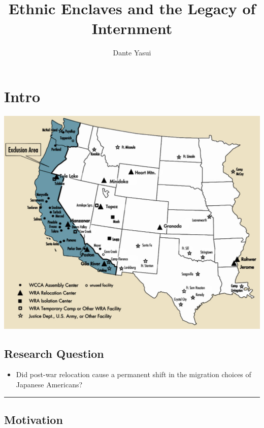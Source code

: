 \documentclass[
]{article}
\title{Ethnic Enclaves and the Legacy of Internment}
\author{Dante Yasui}
\date{}
\providecommand{\tightlist}{%
  \setlength{\itemsep}{0pt}\setlength{\parskip}{0pt}}\usepackage{longtable,booktabs,array}
\begin{document}
\maketitle


\section{Intro}\label{intro}

\begin{center}
\includegraphics{figures/PioCrtInternmentMap.jpg}
\end{center}

\subsection{Research Question}\label{research-question}

\begin{itemize}
\tightlist
\item
  Did post-war relocation cause a permanent shift in the migration
  choices of Japanese Americans?
\end{itemize}

\begin{center}\rule{0.5\linewidth}{0.5pt}\end{center}

\subsection{Motivation}\label{motivation}
\end{document}
